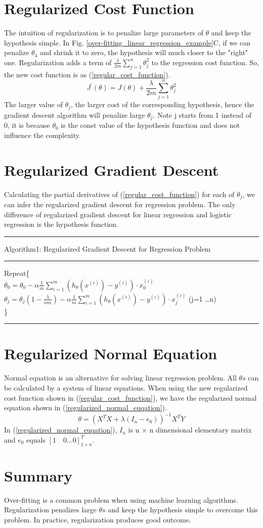 \documentclass{article}
\begin{document}
\section{Regularized Cost Function}
The intuition of regularization is to penalize large parameters of $\theta$ and keep the hypothesis simple. In Fig. \ref{over-fitting_linear_regression_example}C, if we can penalize $\theta_{4}$ and shrink it to zero, the hypothesis will much closer to the "right" one. Regularization adds a term of $\frac{\lambda}{2m} \sum_{j=1}^{n}\theta_{j}^{2}$ to the regression cost function. So, the new cost function is as (\ref{regular_cost_function}).
\begin{equation}\label{regular_cost_function}
J^{'}(\theta) = J(\theta) + \frac{\lambda}{2m} \sum_{j=1}^{n}\theta_{j}^{2}
\end{equation}
The larger value of $\theta_{j}$, the larger cost of the corresponding hypothesis, hence the gradient descent algorithm will penalize large $\theta_{j}$. Note j starts from 1 instead of 0, it is because $\theta_{0}$ is the const value of the hypothesis function and does not influence the complexity.

\section{Regularized Gradient Descent}
Calculating the partial derivatives of (\ref{regular_cost_function}) for each of $\theta_{j}$, we can infer the regularized gradient descent for regression problem. The only difference of regularized gradient descent for linear regression and logistic regression is the hypothesis function.
\smallskip
\hrule
\smallskip
Algorithm1: Regularized Gradient Descent for Regression Problem
\smallskip
\hrule
\smallskip
Repeat\{\\
$\theta_0=\theta_0 - \alpha \frac{1}{m} \sum_{i=1}^{m}(h_\theta(x^{(i)})-y^{(i)}) \cdot x^{(i)}_{0}$\\
$\theta_j=\theta_j(1 - \frac{\lambda}{\alpha m}) - \alpha \frac{1}{m} \sum_{i=1}^{m}(h_\theta(x^{(i)})-y^{(i)}) \cdot x^{(i)}_{j}$ (j=1 \ldots n)\\
\}\\
\hrule
\section{Regularized Normal Equation}
Normal equation is an alternative for solving linear regression problem. All $\theta s$ can be calculated by a system of linear equations. When using the new regularized cost function shown in (\ref{regular_cost_function}), we have the regularized normal equation shown in (\ref{regularized_normal_euqation}).
\begin{equation}\label{regularized_normal_euqation}
\theta = (X^{T}X + \lambda(I_{n} - e_{0}))^{-1}X^{T}Y
\end{equation}
In (\ref{regularized_normal_euqation}), $I_{n}$ is n $\times$ n dimensional elementary matrix and $e_{0}$ equals $[1 \quad 0 \ldots 0]_{1 \times n}^{T}$.

\section{Summary}
Over-fitting is a common problem when using machine learning algorithms. Regularization penalizes large $\theta s$ and keep the hypothesis simple to overcome this problem. In practice, regularization produces good outcome.
\end{document}
